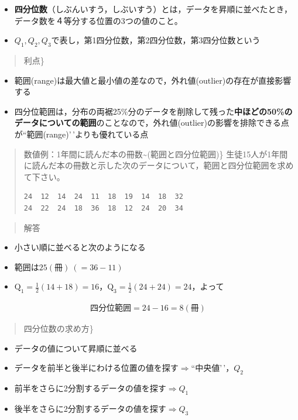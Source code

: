 \documentclass[
]{book}
\providecommand{\tightlist}{%
  \setlength{\itemsep}{0pt}\setlength{\parskip}{0pt}}
\theoremstyle{definition}
\theoremstyle{definition}
\theoremstyle{definition}
\theoremstyle{definition}
\theoremstyle{remark}
\begin{document}
\begin{itemize}
\tightlist
\item
  \textbf{四分位数}（しぶんいすう，しぶいすう）とは，データを昇順に並べたとき，データ数を４等分する位置の3つの値のこと。
\item
  \(Q_1,Q_2,Q_3\)で表し，第1四分位数，第2四分位数，第3四分位数という
\end{itemize}

\begin{quote}
利点\}
\end{quote}

\begin{itemize}
\tightlist
\item
  範囲(range)は最大値と最小値の差なので，外れ値(outlier)の存在が直接影響する
\item
  四分位範囲は，分布の両裾25\%分のデータを削除して残った\textbf{中ほどの50\%のデータについての範囲}のことなので，外れ値(outlier)の影響を排除できる点が``範囲(range)'\,'よりも優れている点
\end{itemize}

\begin{quote}
数値例：1年間に読んだ本の冊数\textasciitilde(範囲と四分位範囲)\}
生徒15人が1年間に読んだ本の冊数と示した次のデータについて，範囲と四分位範囲を求めて下さい。

\begin{verbatim}
24  12  14  24  11  18  19  14  18  32
24  22  24  18  36  18  12  24  20  34
\end{verbatim}
\end{quote}

\begin{quote}
解答
\end{quote}

\begin{itemize}
\item
  小さい順に並べると次のようになる
\item
  範囲は\(25(\text{冊})~(=36-11)\)
\item
  \(\text{Q}_1=\frac{1}{2}(14+18)=16\)，\(\text{Q}_3=\frac{1}{2}(24+24)=24\)，よって
\end{itemize}

\begin{align*}
\text{四分位範囲}=24-16=8(\text{冊})
\end{align*}

\begin{quote}
四分位数の求め方\}
\end{quote}

\begin{itemize}
\tightlist
\item
  データの値について昇順に並べる
\item
  データを前半と後半にわける位置の値を探す\(\Rightarrow\)``中央値'\,'，\(Q_2\)
\item
  前半をさらに2分割するデータの値を探す\(\Rightarrow\)\(Q_1\)
\item
  後半をさらに2分割するデータの値を探す\(\Rightarrow\)\(Q_3\)
\end{itemize}
\end{document}
